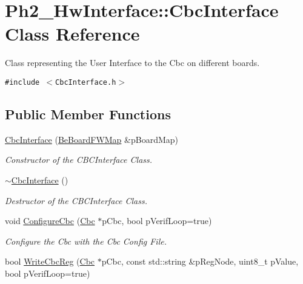 \hypertarget{class_ph2___hw_interface_1_1_cbc_interface}{
\section{Ph2\_\-Hw\-Interface::Cbc\-Interface Class Reference}
\label{class_ph2___hw_interface_1_1_cbc_interface}
}
Class representing the User Interface to the Cbc on different boards.  


{\tt \#include $<$Cbc\-Interface.h$>$}

\subsection*{Public Member Functions}
\begin{CompactItemize}
\item 
\hyperlink{class_ph2___hw_interface_1_1_cbc_interface_405f25c67abece1967d0bd0d738afbe1}{Cbc\-Interface} (\hyperlink{namespace_ph2___hw_interface_59fe3165f25ded62b5b12cf0ebc69e8d}{Be\-Board\-FWMap} \&p\-Board\-Map)
\begin{CompactList}\small\item\em Constructor of the CBCInterface Class. \item\end{CompactList}\item 
\hyperlink{class_ph2___hw_interface_1_1_cbc_interface_1f0ab7d7cf7783a0fe275e8e1d7e5a49}{$\sim$Cbc\-Interface} ()
\begin{CompactList}\small\item\em Destructor of the CBCInterface Class. \item\end{CompactList}\item 
void \hyperlink{class_ph2___hw_interface_1_1_cbc_interface_845ae259c43b47f62ce58aacc042f491}{Configure\-Cbc} (\hyperlink{class_ph2___hw_description_1_1_cbc}{Cbc} $\ast$p\-Cbc, bool p\-Verif\-Loop=true)
\begin{CompactList}\small\item\em Configure the Cbc with the Cbc Config File. \item\end{CompactList}\item 
bool \hyperlink{class_ph2___hw_interface_1_1_cbc_interface_6f35388f75a06e32e784dee21b2c0b1c}{Write\-Cbc\-Reg} (\hyperlink{class_ph2___hw_description_1_1_cbc}{Cbc} $\ast$p\-Cbc, const std::string \&p\-Reg\-Node, uint8\_\-t p\-Value, bool p\-Verif\-Loop=true)

\end{CompactItemize}
